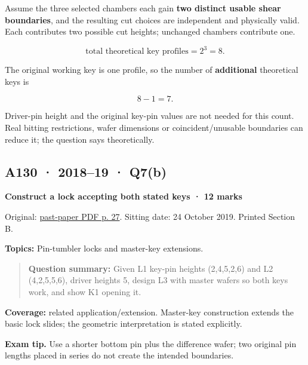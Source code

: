 \documentclass[11pt,a4paper]{article}
\begin{document}
Assume the three selected chambers each gain \textbf{two distinct usable shear boundaries},\allowbreak{} and the resulting cut choices are independent and physically valid. Each contributes two possible cut heights; unchanged chambers contribute one.



\[
\text{total theoretical key profiles}=2^3=8.
\]

The original working key is one profile,\allowbreak{} so the number of \textbf{additional} theoretical keys is



\[
8-1=\boxed{7}.
\]

Driver-pin height and the original key-pin values are not needed for this count. Real bitting restrictions,\allowbreak{} wafer dimensions or coincident/\allowbreak{}unusable boundaries can reduce it; the question says theoretically.




\clearpage
\subsection{A130 · 2018–19 · Q7(b)}\label{a130}

\textbf{Construct a lock accepting both stated keys · 12 marks}


Original: \href{../../CSE405-Security_Merged.pdf\#page=27}{past-paper PDF p. 27}. Sitting date: 24 October 2019. Printed Section B.


\textbf{Topics:} Pin-tumbler locks and master-key extensions.



\begin{quote}\small

\textbf{Question summary:} Given L1 key-pin heights (2,\allowbreak{}4,\allowbreak{}5,\allowbreak{}2,\allowbreak{}6) and L2 (4,\allowbreak{}2,\allowbreak{}5,\allowbreak{}5,\allowbreak{}6),\allowbreak{} driver heights 5,\allowbreak{} design L3 with master wafers so both keys work,\allowbreak{} and show K1 opening it.



\end{quote}

\textbf{Coverage:} related application/\allowbreak{}extension. Master-key construction extends the basic lock slides; the geometric interpretation is stated explicitly.



{\color{ForestGreen}\textbf{Exam tip.} Use a shorter bottom pin plus the difference wafer; two original pin lengths placed in series do not create the intended boundaries.}
\end{document}

